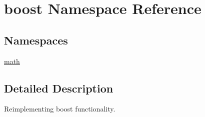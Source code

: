 \hypertarget{namespaceboost}{}\section{boost Namespace Reference}
\label{namespaceboost}
\subsection*{Namespaces}
\begin{DoxyCompactItemize}
\item 
 \hyperlink{namespaceboost_1_1math}{math}
\end{DoxyCompactItemize}


\subsection{Detailed Description}
Reimplementing boost functionality. 